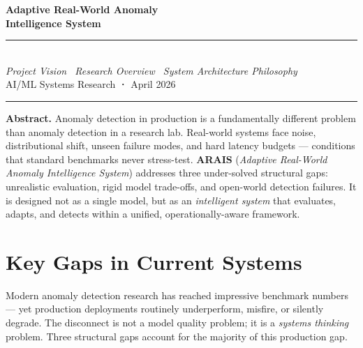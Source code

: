 \documentclass[11pt, a4paper]{article}
\begin{document}

\begin{center}
  {\fontsize{22}{26}\selectfont\bfseries\color{primary}
    Adaptive Real-World Anomaly\\[4pt]Intelligence System}\\[10pt]
  {\large\color{accent}\rule{6cm}{1.2pt}}\\[8pt]
  {\normalsize\color{subtle}
    \textit{Project Vision \textbar\ Research Overview \textbar\ System Architecture Philosophy}}\\[6pt]
  {\small\color{subtle} AI/ML Systems Research \textbf{·} April 2026}
\end{center}

\vspace{6pt}
\noindent\color{accent}\rule{\linewidth}{1.2pt}
\vspace{8pt}

\begin{visionbox}
\noindent\textbf{\color{primary}Abstract.}\quad
Anomaly detection in production is a fundamentally different problem than anomaly detection in a research lab.
Real-world systems face noise, distributional shift, unseen failure modes, and hard latency budgets — 
conditions that standard benchmarks never stress-test.
\textbf{ARAIS} (\textit{Adaptive Real-World Anomaly Intelligence System}) addresses three under-solved 
structural gaps: unrealistic evaluation, rigid model trade-offs, and open-world detection failures.
It is designed not as a single model, but as an \textit{intelligent system} that evaluates, adapts, and detects
within a unified, operationally-aware framework.
\end{visionbox}

\vspace{4pt}

\section{Key Gaps in Current Systems}

Modern anomaly detection research has reached impressive benchmark numbers — 
yet production deployments routinely underperform, misfire, or silently degrade.
The disconnect is not a model quality problem; it is a \textit{systems thinking} problem.
Three structural gaps account for the majority of this production gap.
\end{document}
